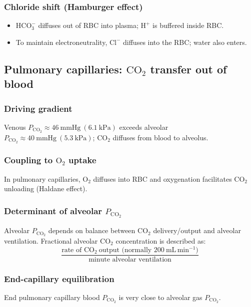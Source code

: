 \documentclass[11pt,a4paper]{article}
\begin{document}
\subsubsection{Chloride shift (Hamburger effect)}
\begin{itemize}
  \item \(\mathrm{HCO_3^-}\) diffuses out of RBC into plasma; \(\mathrm{H^+}\) is buffered inside RBC.
  \item To maintain electroneutrality, \(\mathrm{Cl^-}\) diffuses into the RBC; water also enters.
\end{itemize}

\subsection{Pulmonary capillaries: \(\mathrm{CO_2}\) transfer out of blood}
\subsubsection{Driving gradient}
Venous \(P_{\mathrm{CO_2}} \approx 46~\mathrm{mmHg}~(6.1~\mathrm{kPa})\) exceeds alveolar \(P_{\mathrm{CO_2}} \approx 40~\mathrm{mmHg}~(5.3~\mathrm{kPa})\); \(\mathrm{CO_2}\) diffuses from blood to alveolus.

\subsubsection{Coupling to \(\mathrm{O_2}\) uptake}
In pulmonary capillaries, \(\mathrm{O_2}\) diffuses into RBC and oxygenation facilitates \(\mathrm{CO_2}\) unloading (Haldane effect).

\subsubsection{Determinant of alveolar \(P_{\mathrm{CO_2}}\)}
Alveolar \(P_{\mathrm{CO_2}}\) depends on balance between \(\mathrm{CO_2}\) delivery/output and alveolar ventilation. Fractional alveolar \(\mathrm{CO_2}\) concentration is described as:
\[
  \frac{\text{rate of } \mathrm{CO_2}\ \text{output (normally }200~\mathrm{mL\,min^{-1}}\text{)}}{\text{minute alveolar ventilation}}
\]

\subsubsection{End-capillary equilibration}
End pulmonary capillary blood \(P_{\mathrm{CO_2}}\) is very close to alveolar gas \(P_{\mathrm{CO_2}}\).
\end{document}
